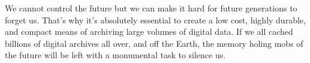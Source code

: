 We cannot control the future but we can make it hard for future
generations to forget us. That's why it's absolutely essential to create
a low cost, highly durable, and compact means of archiving large volumes
of digital data. If we all cached billions of digital archives all over,
and off the Earth, the memory holing mobs of the future will be left
with a monumental task to silence us.


%
 
 

